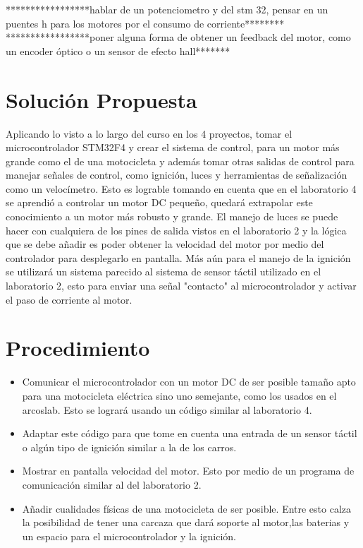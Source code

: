 \documentclass[letterpaper]{article}
\begin{document}
*****************hablar de un potenciometro y del stm 32, pensar en un puentes h para los motores por el consumo de corriente********
*****************poner alguna forma de obtener un feedback del motor, como un encoder óptico o un sensor de efecto hall*******


\section{Solución Propuesta}
Aplicando lo visto a lo largo del curso en los 4 proyectos, tomar el microcontrolador STM32F4 y crear el sistema de control, para un motor más grande como el de una motocicleta y además tomar otras salidas de control para manejar señales de control, como ignición, luces y herramientas de señalización como un velocímetro.
Esto es lograble tomando en cuenta que en el laboratorio 4 se aprendió a controlar un motor DC pequeño, quedará extrapolar este  conocimiento a un motor más robusto y grande.
El manejo de luces se puede hacer con cualquiera de los pines de salida vistos en el laboratorio 2 y la lógica que se debe añadir es poder obtener la velocidad del motor por medio del controlador para desplegarlo en pantalla. Más aún para el manejo de la ignición se utilizará un sistema parecido al sistema de sensor táctil utilizado en el laboratorio 2, esto para enviar una señal "contacto" al microcontrolador y activar el paso de corriente al motor.

\section{Procedimiento}
\begin{itemize}
\item Comunicar el microcontrolador con un motor DC de ser posible tamaño apto para una motocicleta eléctrica sino uno semejante, como los
usados en el arcoslab. Esto se logrará usando un código similar al laboratorio 4.
\item Adaptar este código para que tome en cuenta una entrada de un sensor táctil o algún tipo de ignición similar a la de los carros.
\item Mostrar en pantalla velocidad del motor. Esto por medio de un programa de comunicación similar al del laboratorio 2.
\item Añadir cualidades físicas de una motocicleta de ser posible. Entre esto calza la posibilidad de tener una carcaza que dará soporte
al motor,las baterias y un espacio para el microcontrolador y la ignición.
\end{itemize}
\end{document}
